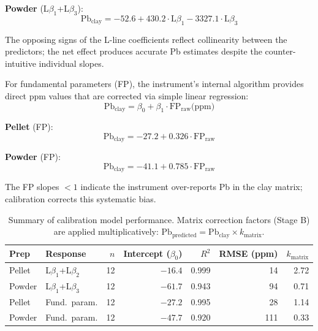 \documentclass[journal=esthag,manuscript=suppinfo]{achemso}
\begin{document}
\textbf{Powder} (L$\beta_1$+L$\beta_3$):
\begin{equation}
\text{Pb}_\text{clay} = -52.6 + 430.2 \cdot \text{L}\beta_1 - 3327.1 \cdot \text{L}\beta_3
\label{eq:powder_model}
\end{equation}

The opposing signs of the L-line coefficients reflect collinearity between the predictors; the net effect produces accurate Pb estimates despite the counter-intuitive individual slopes.

For fundamental parameters (FP), the instrument's internal algorithm provides direct ppm values that are corrected via simple linear regression:
\begin{equation}
\text{Pb}_\text{clay} = \beta_0 + \beta_1 \cdot \text{FP}_\text{raw}\text{(ppm)}
\label{eq:fp_model}
\end{equation}

\textbf{Pellet} (FP):
\begin{equation}
\text{Pb}_\text{clay} = -27.2 + 0.326 \cdot \text{FP}_\text{raw}
\label{eq:pellet_fp_model}
\end{equation}

\textbf{Powder} (FP):
\begin{equation}
\text{Pb}_\text{clay} = -41.1 + 0.785 \cdot \text{FP}_\text{raw}
\label{eq:powder_fp_model}
\end{equation}

The FP slopes $<1$ indicate the instrument over-reports Pb in the clay matrix; calibration corrects this systematic bias.

\begin{table}[htbp]
\caption{Summary of calibration model performance. Matrix correction factors (Stage B) are applied multiplicatively: $\text{Pb}_\text{predicted} = \text{Pb}_\text{clay} \times k_\text{matrix}$.}
\label{tab:model_coefficients}
\centering
\small
\begin{tabular}{llrrrrr}
\toprule
Prep & Response & $n$ & Intercept ($\beta_0$) & $R^2$ & RMSE (ppm) & $k_\text{matrix}$ \\
\midrule
Pellet & L$\beta_1$+L$\beta_2$ & 12 & $-16.4$ & 0.999 & 14 & 2.72 \\
Powder & L$\beta_1$+L$\beta_3$ & 12 & $-61.7$ & 0.943 & 94 & 0.71 \\
Pellet & Fund.\ param. & 12 & $-27.2$ & 0.995 & 28 & 1.14 \\
Powder & Fund.\ param. & 12 & $-47.7$ & 0.920 & 111 & 0.33 \\
\bottomrule
\end{tabular}
\end{table}
\end{document}
